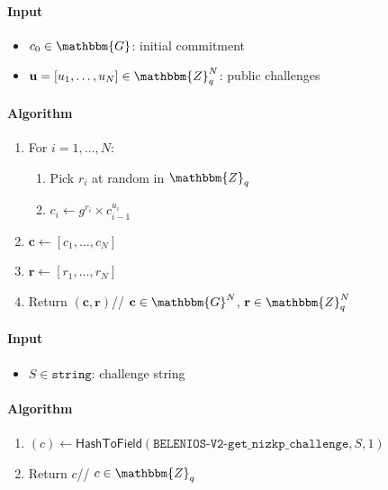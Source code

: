 \documentclass[a4paper]{article}
\newcommand{\dstprefix}{BELENIOS-V2}
\newcommand{\G}{\mathbbm{G}}
\newcommand{\Z}{\mathbbm{Z}}
\newcommand{\jstring}{\texttt{string}}
\begin{document}
\begin{table}
  \begin{framed}
    \noindent\paragraph{Input}
    \begin{itemize}
    \item $c_0\in\G$: initial commitment
    \item $\textbf{u}=[u_1,\dots,u_N]\in\Z_q^N$: public challenges
    \end{itemize}
    \noindent\paragraph{Algorithm}
    \begin{enumerate}
    \item For $i=1,\dots,N$:
      \begin{enumerate}
      \item Pick $r_i$ at random in $\Z_q$
      \item $c_i\leftarrow g^{r_i}\times c_{i-1}^{u_i}$
      \end{enumerate}
    \item $\textbf{c}\leftarrow[c_1,\dots,c_N]$
    \item $\textbf{r}\leftarrow[r_1,\dots,r_N]$
    \item Return $(\textbf{c},\textbf{r})$\hfill//
      $\textbf{c}\in\G^N$, $\textbf{r}\in\Z_q^N$
    \end{enumerate}
  \end{framed}
  \caption{Function $\mathsf{GenCommitmentChain}(c_0,\textbf{u})$}
  \label{gen-commitment-chain}
\end{table}

\begin{table}
  \begin{framed}
    \noindent\paragraph{Input}
    \begin{itemize}
    \item $S\in\jstring$: challenge string
    \end{itemize}
    \noindent\paragraph{Algorithm}
    \begin{enumerate}
    \item
      $(c)\leftarrow\textsf{HashToField}(\texttt{\dstprefix-get\_nizkp\_challenge},S,1)$
    \item Return $c$\hfill// $c\in\Z_q$
    \end{enumerate}
  \end{framed}
  \caption{Function $\mathsf{GetNIZKPChallenge}(S)$}
  \label{get-nizkp-challenge}
\end{table}

\FloatBarrier



\end{document}

